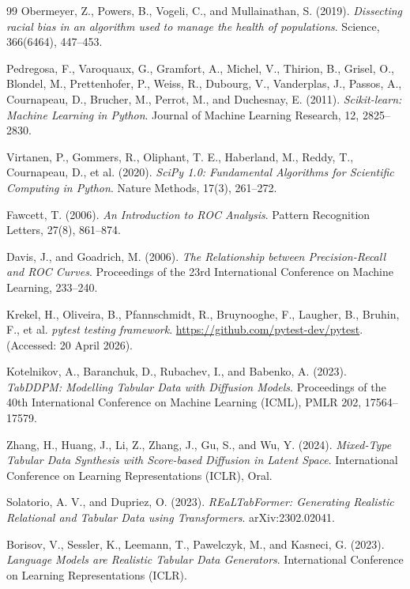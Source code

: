 \documentclass[11pt]{informatics-report}
\begin{document}
\begin{thebibliography}{99}
Obermeyer, Z., Powers, B., Vogeli, C., and Mullainathan, S. (2019).
\textit{Dissecting racial bias in an algorithm used to manage the health of populations}.
Science, 366(6464), 447--453.

Pedregosa, F., Varoquaux, G., Gramfort, A., Michel, V., Thirion, B., Grisel, O.,
Blondel, M., Prettenhofer, P., Weiss, R., Dubourg, V., Vanderplas, J., Passos, A.,
Cournapeau, D., Brucher, M., Perrot, M., and Duchesnay, E. (2011).
\textit{Scikit-learn: Machine Learning in Python}.
Journal of Machine Learning Research, 12, 2825--2830.

Virtanen, P., Gommers, R., Oliphant, T. E., Haberland, M., Reddy, T., Cournapeau, D., et al. (2020).
\textit{SciPy 1.0: Fundamental Algorithms for Scientific Computing in Python}.
Nature Methods, 17(3), 261--272.

Fawcett, T. (2006).
\textit{An Introduction to ROC Analysis}.
Pattern Recognition Letters, 27(8), 861--874.

Davis, J., and Goadrich, M. (2006).
\textit{The Relationship between Precision-Recall and ROC Curves}.
Proceedings of the 23rd International Conference on Machine Learning, 233--240.

Krekel, H., Oliveira, B., Pfannschmidt, R., Bruynooghe, F., Laugher, B., Bruhin, F., et al.
\textit{pytest testing framework}.
\url{https://github.com/pytest-dev/pytest}.
(Accessed: 20 April 2026).

Kotelnikov, A., Baranchuk, D., Rubachev, I., and Babenko, A. (2023).
\textit{TabDDPM: Modelling Tabular Data with Diffusion Models}.
Proceedings of the 40th International Conference on Machine Learning (ICML), PMLR 202, 17564--17579.

Zhang, H., Huang, J., Li, Z., Zhang, J., Gu, S., and Wu, Y. (2024).
\textit{Mixed-Type Tabular Data Synthesis with Score-based Diffusion in Latent Space}.
International Conference on Learning Representations (ICLR), Oral.

Solatorio, A. V., and Dupriez, O. (2023).
\textit{REaLTabFormer: Generating Realistic Relational and Tabular Data using Transformers}.
arXiv:2302.02041.

Borisov, V., Sessler, K., Leemann, T., Pawelczyk, M., and Kasneci, G. (2023).
\textit{Language Models are Realistic Tabular Data Generators}.
International Conference on Learning Representations (ICLR).


\end{thebibliography}
\end{document}
